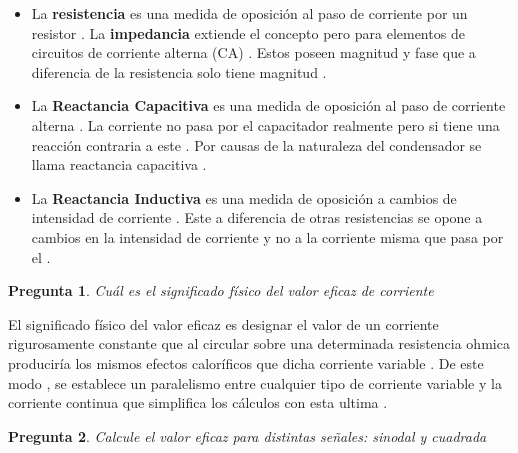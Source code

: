\documentclass[a4paper,12pt]{article}
\newtheorem{preg}{Pregunta} %
\begin{document}
\begin{itemize}
\item La \textbf{resistencia} es una medida de oposición al paso de corriente por un resistor . La \textbf{impedancia} extiende el concepto pero para elementos de circuitos de corriente alterna (CA) . Estos poseen magnitud y fase que a diferencia de la resistencia solo tiene magnitud . 
\item La \textbf{Reactancia Capacitiva} es una medida de oposición al paso de corriente alterna . La corriente no pasa por el capacitador realmente pero si tiene una reacción contraria a este . Por causas de la naturaleza del condensador se llama reactancia capacitiva .
\item La \textbf{Reactancia Inductiva} es una medida de oposición a cambios de intensidad de corriente . Este a diferencia de otras resistencias se opone a cambios en la intensidad de corriente y no a la corriente misma que pasa por el .  
\end{itemize}



\begin{preg}
Cuál es el significado físico del valor eficaz de corriente
\end{preg}

El significado físico del valor eficaz es designar el valor de un corriente rigurosamente constante que al circular sobre una determinada resistencia ohmica produciría los mismos efectos caloríficos que dicha corriente variable . De este modo , se establece un paralelismo entre cualquier tipo de corriente variable y la corriente continua que simplifica los cálculos con esta ultima . 



\begin{preg}
Calcule el valor eficaz para distintas señales: sinodal y cuadrada
\end{preg}
\end{document}
